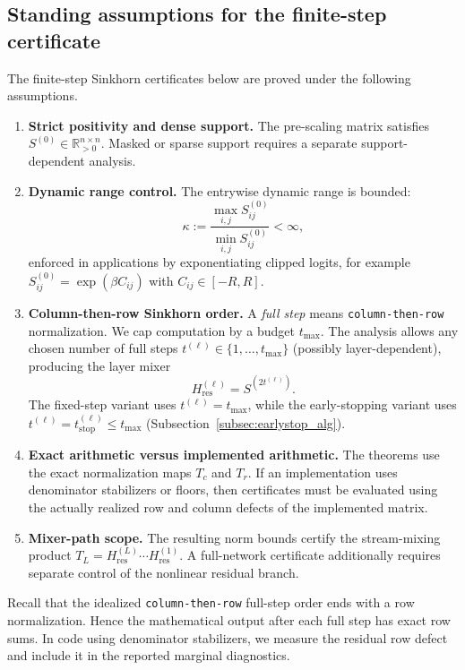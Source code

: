 \documentclass[11pt]{article}
\numberwithin{equation}{section}
\theoremstyle{plain}
\theoremstyle{definition}
\theoremstyle{remark}
\newcommand{\R}{\mathbb{R}}
\newcommand{\Hres}{H_{\mathrm{res}}}
\newcommand{\tstop}{t_{\mathrm{stop}}}
\newcommand{\tmax}{t_{\max}}
\begin{document}
 
\subsection*{Standing assumptions for the finite-step certificate}

The finite-step Sinkhorn certificates below are proved under the following
assumptions.
\begin{enumerate}[leftmargin=*, itemsep=0.25em]
\item \textbf{Strict positivity and dense support.}
The pre-scaling matrix satisfies \(S^{(0)}\in\R^{n\times n}_{>0}\).  Masked or
sparse support requires a separate support-dependent analysis.

\item \textbf{Dynamic range control.}
The entrywise dynamic range is bounded:
\begin{equation}\label{eq:kappa_def}
\kappa:=\frac{\max_{i,j}S^{(0)}_{ij}}{\min_{i,j}S^{(0)}_{ij}}<\infty,
\end{equation}
enforced in applications by exponentiating clipped logits, for example
\(S^{(0)}_{ij}=\exp(\beta C_{ij})\) with \(C_{ij}\in[-R,R]\).

\item \textbf{Column-then-row Sinkhorn order.}
A \emph{full step} means \texttt{column-then-row} normalization.
We cap computation by a budget $\tmax$. The analysis allows any chosen number of full steps
$t^{(\ell)}\in\{1,\dots,\tmax\}$ (possibly layer-dependent), producing the layer mixer
\begin{equation}\label{eq:H_from_steps}
\Hres^{(\ell)}=S^{(2t^{(\ell)})}.
\end{equation}
The fixed-step variant uses $t^{(\ell)}=\tmax$, while the early-stopping variant uses
$t^{(\ell)}=\tstop^{(\ell)}\le \tmax$ (Subsection~\ref{subsec:earlystop_alg}).

\item \textbf{Exact arithmetic versus implemented arithmetic.}
The theorems use the exact normalization maps \(T_c\) and \(T_r\).  If an
implementation uses denominator stabilizers or floors, then certificates must be
evaluated using the actually realized row and column defects of the implemented
matrix.

\item \textbf{Mixer-path scope.}
The resulting norm bounds certify the stream-mixing product
\(T_L=\Hres^{(L)}\cdots \Hres^{(1)}\).  A full-network certificate additionally
requires separate control of the nonlinear residual branch.
\end{enumerate}
Recall that the idealized \texttt{column-then-row} full-step order ends with
a row normalization. Hence the mathematical output after each full step has exact
row sums. In code using denominator stabilizers, we measure the residual row
defect and include it in the reported marginal diagnostics.
\end{document}
